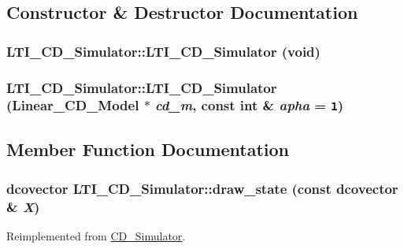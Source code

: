 \subsection{Constructor \& Destructor Documentation}
\hypertarget{class_l_t_i___c_d___simulator_86b38b889838a1efdec15f1f18fd55f3}{
\subsubsection[{LTI\_\-CD\_\-Simulator}]{\setlength{\rightskip}{0pt plus 5cm}LTI\_\-CD\_\-Simulator::LTI\_\-CD\_\-Simulator (void)}}
\label{class_l_t_i___c_d___simulator_86b38b889838a1efdec15f1f18fd55f3}


\hypertarget{class_l_t_i___c_d___simulator_3126a80b8ca7eaec68232e470d0c0595}{
\subsubsection[{LTI\_\-CD\_\-Simulator}]{\setlength{\rightskip}{0pt plus 5cm}LTI\_\-CD\_\-Simulator::LTI\_\-CD\_\-Simulator ({\bf Linear\_\-CD\_\-Model} $\ast$ {\em cd\_\-m}, \/  const int \& {\em apha} = {\tt 1})}}
\label{class_l_t_i___c_d___simulator_3126a80b8ca7eaec68232e470d0c0595}




\subsection{Member Function Documentation}
\hypertarget{class_l_t_i___c_d___simulator_1497e233ff1a0d71c2b660fe270c9ff8}{
\subsubsection[{draw\_\-state}]{\setlength{\rightskip}{0pt plus 5cm}dcovector LTI\_\-CD\_\-Simulator::draw\_\-state (const dcovector \& {\em X})}}
\label{class_l_t_i___c_d___simulator_1497e233ff1a0d71c2b660fe270c9ff8}




Reimplemented from \hyperlink{class_c_d___simulator_11c411df9b1e0d6f8576edefd723dd47}{CD\_\-Simulator}.
